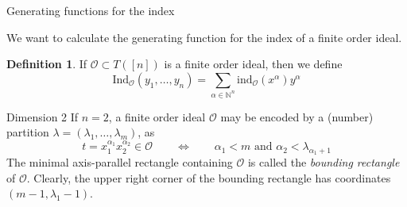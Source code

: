 \documentclass[reqno,a4paper,10pt]{amsart}
\theoremstyle{definition}
\newtheorem{definition}{Definition}
\theoremstyle{remark}
\theoremstyle{plain}
\newcommand{\Nat}{{\mathbb{N}}}
\newcommand{\ind}{\mathrm{ind}}
\newcommand{\Ind}{\mathrm{Ind}}
\begin{document}
\begin{section}{Generating functions for the index}

  We want to calculate the generating function for the index of a finite order ideal.
  \begin{definition}
    If \(\mathcal{O} \subset T([n])\) is a finite order ideal, then we
    define
    \begin{equation}
      \label{eq:6}
      \Ind_{\mathcal{O}}(y_1,\dots,y_n) = \sum_{\alpha \in \Nat^n}
      \ind_\mathcal{O}(x^\alpha) y^\alpha
    \end{equation}
  \end{definition}

\begin{subsection}{Dimension 2}  
  If \(n=2\), a finite order ideal \(\mathcal{O}\) may be encoded by a
  (number) partition 
  \(\lambda=(\lambda_1,\dots, \lambda_m)\), as
  \begin{equation}
    \label{eq:2dim}
    t=x_1^{\alpha_1}x_2^{\alpha_2} \in \mathcal{O} \qquad \iff \qquad 
    \alpha_1 <m \text{ and } \alpha_2 < \lambda_{\alpha_1+1}
  \end{equation}
  The minimal axis-parallel rectangle containing \(\mathcal{O}\) is
  called the \emph{bounding rectangle} of \(\mathcal{O}\). Clearly,
  the upper right corner of the bounding rectangle has coordinates
  \((m-1,\lambda_1 -1)\).
  

\end{subsection}
\end{section}
\end{document}
